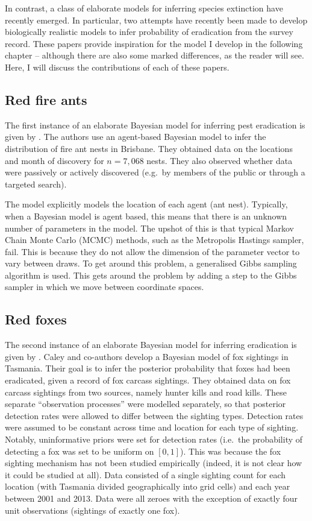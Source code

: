 \documentclass[
]{book}
\begin{document}
In contrast, a class of elaborate models for inferring species extinction have recently emerged. In particular, two attempts have recently been made to develop biologically realistic models to infer probability of eradication from the survey record. These papers provide inspiration for the model I develop in the following chapter -- although there are also some marked differences, as the reader will see. Here, I will discuss the contributions of each of these papers.

\hypertarget{red-fire-ants}{%
\subsection{Red fire ants}\label{red-fire-ants}}

The first instance of an elaborate Bayesian model for inferring pest eradication is given by \citet{keith2013}. The authors use an agent-based Bayesian model to infer the distribution of fire ant nests in Brisbane. They obtained data on the locations and month of discovery for \(n = 7{,}068\) nests. They also observed whether data were passively or actively discovered (e.g.~by members of the public or through a targeted search).

The model explicitly models the location of each agent (ant nest). Typically, when a Bayesian model is agent based, this means that there is an unknown number of parameters in the model. The upshot of this is that typical Markov Chain Monte Carlo (MCMC) methods, such as the Metropolis Hastings sampler, fail. This is because they do not allow the dimension of the parameter vector to vary between draws. To get around this problem, a generalised Gibbs sampling algorithm is used. This gets around the problem by adding a step to the Gibbs sampler in which we move between coordinate spaces.

\hypertarget{red-foxes}{%
\subsection{Red foxes}\label{red-foxes}}

The second instance of an elaborate Bayesian model for inferring eradication is given by \citet{caley2015}. Caley and co-authors develop a Bayesian model of fox sightings in Tasmania. Their goal is to infer the posterior probability that foxes had been eradicated, given a record of fox carcass sightings. They obtained data on fox carcass sightings from two sources, namely hunter kills and road kills. These separate ``observation processes'' were modelled separately, so that posterior detection rates were allowed to differ between the sighting types. Detection rates were assumed to be constant across time and location for each type of sighting. Notably, uninformative priors were set for detection rates (i.e.~the probability of detecting a fox was set to be uniform on \([0, 1]\)). This was because the fox sighting mechanism has not been studied empirically (indeed, it is not clear how it could be studied at all). Data consisted of a single sighting count for each location (with Tasmania divided geographically into grid cells) and each year between 2001 and 2013. Data were all zeroes with the exception of exactly four unit observations (sightings of exactly one fox).
\end{document}
